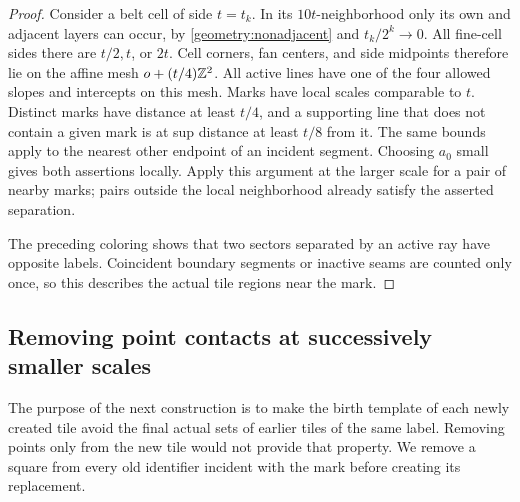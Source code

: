 \begin{proof}
Consider a belt cell of side $t=t_k$.  In its $10t$-neighborhood only its
own and adjacent layers can occur, by \eqref{geometry:nonadjacent} and
$t_k/2^k\to0$.  All fine-cell sides there are $t/2,t$, or $2t$.
Cell corners, fan centers, and side midpoints therefore lie on the affine
mesh $o+(t/4)\mathbb Z^2$.  All active lines have one of the four allowed slopes
and intercepts on this mesh.  Marks have local scales comparable to $t$.
Distinct marks have distance at least $t/4$, and a supporting line that
does not contain a given mark is at sup distance at least $t/8$ from it.
The same bounds apply to the nearest other endpoint of an incident
segment.
Choosing $a_0$ small gives both assertions locally.  Apply this argument
at the larger scale for a pair of nearby marks; pairs outside the local
neighborhood already satisfy the asserted separation.

The preceding coloring shows that two sectors separated by an active
ray have opposite labels.  Coincident boundary segments or inactive seams
are counted only once, so this describes the actual tile regions near
the mark.
\end{proof}

\subsection{Removing point contacts at successively smaller scales}

The purpose of the next construction is to make the birth template of
each newly created tile avoid the final actual sets of earlier tiles of
the same label.  Removing points only from the new tile would not provide
that property.  We remove a square from every old identifier incident
with the mark before creating its replacement.

